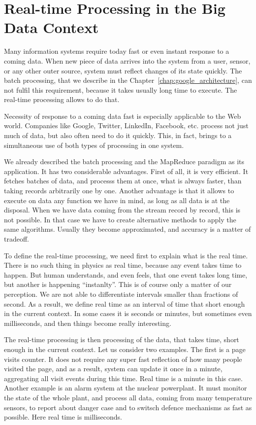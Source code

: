 \chapter{Real-time Processing in the Big Data Context}
\label{chap:real_time_processing}

Many information systems require today fast or even instant response to a coming data.
When new piece of data arrives into the system from a user, sensor, or any other outer source, system must reflect changes of its state quickly. 
The batch processing, that we describe in the Chapter~\ref{chap:google_architecture}, can not fulfil this requirement, because it takes usually long time to execute.
The real-time processing allows to do that.

Necessity of response to a coming data fast is especially applicable to the Web world.
Companies like Google, Twitter, LinkedIn, Facebook, etc. process not just much of data, but also often need to do it quickly.
This, in fact, brings to a simultaneous use of both types of processing in one system.

We already described the batch processing and the MapReduce paradigm as its application.
It has two considerable advantages.
First of all, it is very efficient.
It fetches batches of data, and processs them at once, what is always faster, than taking records arbitrarily one by one.
Another advantage is that it allows to execute on data any function we have in mind, as long as all data is at the disposal.
When we have data coming from the stream record by record, this is not possible.
In that case we have to create alternative methods to apply the same algorithms.
Usually they become approximated, and accuracy is a matter of tradeoff.

To define the real-time processing, we need first to explain what is the real time.
There is no such thing in physics as real time, because any event takes time to happen.
But human understands, and even feels, that one event takes long time, but another is happening ``instanlty''.
This is of course only a matter of our perception.
We are not able to differentiate intervals smaller than fractions of second.
As a result, we define real time as an interval of time that short enough in the current context.
In some cases it is seconds or minutes, but sometimes even milliseconds, and then things become really interesting.

The real-time processing is then processing of the data, that takes time, short enough in the current context.
Let us consider two examples.
The first is a page visits counter.
It does not require any super fast reflection of how many people visited the page, and as a result, system can update it once in a minute, aggregating all visit events during this time.
Real time is a minute in this case.
Another example is an alarm system at the nuclear powerplant.
It must monitor the state of the whole plant, and process all data, coming from many temperature sensors, to report about danger case and to switsch defence mechanisms as fast as possible.
Here real time is milliseconds.

